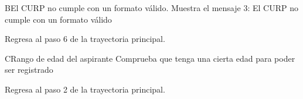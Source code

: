 \begin{UCtrayectoriaA}{B}{El CURP no cumple con un formato válido.}
	\UCpaso[\UCsist] Muestra el mensaje 3: El CURP no cumple con un formato válido
			
	\UCpaso[] Regresa al paso 6 de la trayectoria principal.
	
\end{UCtrayectoriaA}

\begin{UCtrayectoriaA}{C}{Rango de edad del aspirante}
	\UCpaso[\UCsist]Comprueba que tenga una cierta edad para poder ser registrado
			
	\UCpaso[] Regresa al paso 2 de la trayectoria principal.
	
\end{UCtrayectoriaA}
